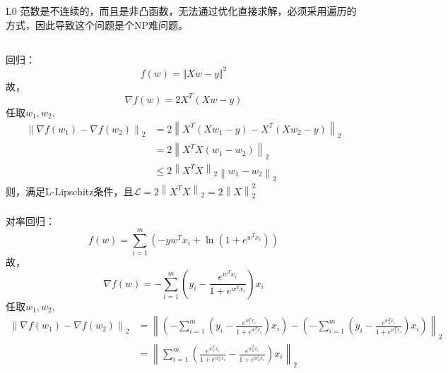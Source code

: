 \documentclass[UTF8,a4paper,AutoFakeBold,AutoFakeSlant]{article}
\begin{document}
L0 范数是不连续的，而且是非凸函数，无法通过优化直接求解，必须采用遍历的方式，因此导致这个问题是个NP难问题。



\subsection{}

\subsubsection{}

回归：
$$ f(w) = \Vert Xw-y \Vert^2  $$
故，
$$ \nabla f(w) = 2X^T(Xw-y) $$
任取$w_1, w_2$,
\begin{equation*}
  \begin{aligned}
    \left\|\nabla f(w_1)-\nabla f(w_2) \right\|_2 & = 2 \left\|X^T(Xw_1-y)-X^T(Xw_2-y) \right\|_2            \\
                                                  & = 2 \left\|X^T X(w_1-w_2) \right\|_2                     \\
                                                  & \leq 2 \left\|X^T X \right\|_2 \left\|w_1-w_2 \right\|_2
  \end{aligned}
\end{equation*}
则，满足L-Lipschitz条件，且$ \mathcal{L} = 2 \left\|X^T X \right\|_2 = 2 \left\| X \right\|_2^2 $


\subsubsection{}

对率回归：
$$ f(w) = \sum_{i=1}^{m} (-yw^{T}x_i + \ln (1+e^{w^{T}x_i})) $$
故，
$$ \nabla f(w) = -\sum_{i=1}^{m} (y_i - \frac{e^{w^{T}x_i}}{1+e^{w^{T}x_i}})x_i $$
任取$w_1, w_2$,
\begin{equation*}
  \begin{aligned}
    \left\|\nabla f(w_1)-\nabla f(w_2) \right\|_2 & = \left\|(-\sum_{i=1}^{m} (y_i - \frac{e^{w_1^{T}x_i}}{1+e^{w_1^{T}x_i}})x_i) - (-\sum_{i=1}^{m} (y_i - \frac{e^{w_2^{T}x_i}}{1+e^{w_2^{T}x_i}})x_i) \right\|_2 \\
                                                  & = \left\|\sum_{i=1}^{m} (\frac{e^{w_1^{T}x_i}}{1+e^{w_1^{T}x_i}}-\frac{e^{w_2^{T}x_i}}{1+e^{w_2^{T}x_i}})x_i \right\|_2
  \end{aligned}
\end{equation*}
\end{document}
